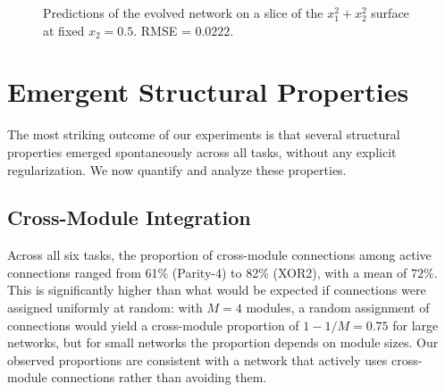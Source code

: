 \begin{figure}[h]
  \centering
  \caption{Predictions of the evolved network on a slice of the
    $x_1^2 + x_2^2$ surface at fixed $x_2 = 0.5$. RMSE = $0.0222$.}
  \label{fig:circle-predictions}
\end{figure}

\section{Emergent Structural Properties}
\label{sec:results-emergent}

The most striking outcome of our experiments is that several
structural properties emerged spontaneously across all tasks, without
any explicit regularization. We now quantify and analyze these
properties.

\subsection{Cross-Module Integration}
\label{sec:results-cross-module}

Across all six tasks, the proportion of cross-module connections
among active connections ranged from 61\% (Parity-4) to 82\% (XOR2),
with a mean of $72\%$. This is significantly higher than what would
be expected if connections were assigned uniformly at random: with
$M = 4$ modules, a random assignment of connections would yield a
cross-module proportion of $1 - 1/M = 0.75$ for large networks, but
for small networks the proportion depends on module sizes. Our
observed proportions are consistent with a network that actively uses
cross-module connections rather than avoiding them.

